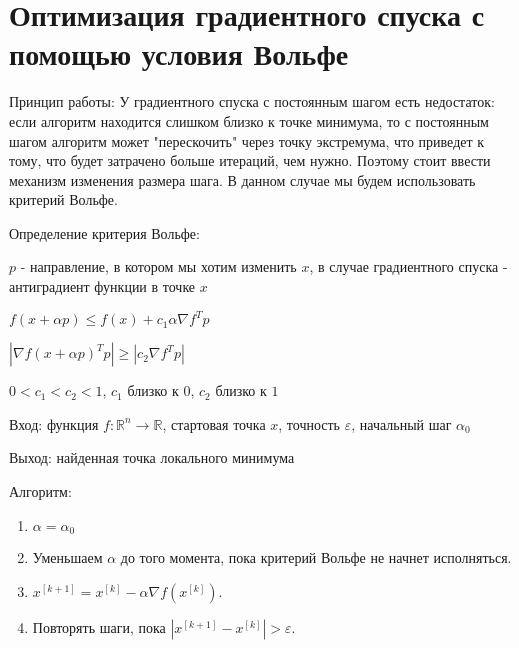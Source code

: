 \section{Оптимизация градиентного спуска с помощью условия Вольфе}

    Принцип работы:
    У градиентного спуска с постоянным шагом есть недостаток: если алгоритм находится слишком близко к точке минимума, то с постоянным шагом алгоритм может "перескочить" через точку экстремума, что приведет к тому, что будет затрачено больше итераций, чем нужно. Поэтому стоит ввести механизм изменения размера шага. В данном случае мы будем использовать критерий Вольфе.

    Определение критерия Вольфе:

    $p$ - направление, в котором мы хотим изменить $x$, в случае градиентного спуска - антиградиент функции в точке $x$

    $f(x + \alpha p) \leq f(x) + c_1 \alpha \nabla f^T p$

    $|\nabla f(x + \alpha p)^T p| \geq |c_2 \nabla f^T p|$

    $0 < c_1 < c_2 < 1$, $c_1$ близко к $0$, $c_2$ близко к $1$

    
    
    Вход: функция $f:\mathbb{R}^n \rightarrow \mathbb{R}$, стартовая точка $x$, точность $\varepsilon$, начальный шаг $\alpha_0$

    Выход: найденная точка локального минимума

    Алгоритм:
    \begin{enumerate}
        \item $\alpha = \alpha_0$
        \item Уменьшаем $\alpha$ до того момента, пока критерий Вольфе не начнет исполняться.
        \item $x^{[k + 1]} = x^{[k]} - \alpha\nabla f(x^{[k]})$.
        \item Повторять шаги, пока  $|x^{[k+1]} - x^{[k]}| > \varepsilon$.
    \end{enumerate}
    

\endinput